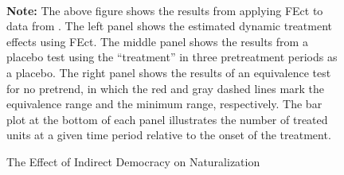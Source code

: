 \documentclass[12pt]{article}
\begin{document}
\begin{figure}[!ht]
\caption{The Effect of Indirect Democracy on Naturalization}\label{fg:HH2015}
\centering
\begin{minipage}{1\linewidth}{
\centering
\hspace{-1em}
\\
}
\footnotesize\textbf{Note:} The above figure shows the results from applying FEct to data from \citet{hainmueller2015does}. The left panel shows the estimated dynamic treatment effects using FEct. The middle panel shows the results from a placebo test using the ``treatment'' in three pretreatment periods as a placebo. The right panel shows the results of an equivalence test for no pretrend, in which the red and gray dashed lines mark the equivalence range and the minimum range, respectively. The bar plot at the bottom of each panel illustrates the number of treated units at a given time period relative to the onset of the treatment.
\end{minipage}\vspace{-0.5em}
\end{figure}
\end{document}
